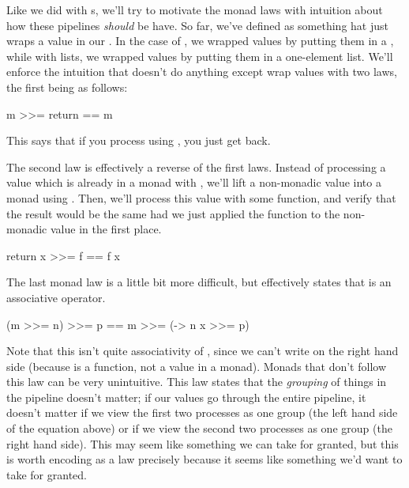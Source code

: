 Like we did with s, we'll try to motivate the monad laws with intuition about how
these pipelines \emph{should} be have. So far, we've defined  as something hat just
wraps a value in our . In the case of , we wrapped values by putting
them in a , while with lists, we wrapped values by putting them in a one-element list.
We'll enforce the intuition that  doesn't do anything except wrap values with two
laws, the first being as follows:
\begin{haskell}
m >>= return == m
\end{haskell}
This says that if you process  using , you just get  back.

The second law is effectively a reverse of the first laws. Instead of processing a value which is
already in a monad with , we'll lift a non-monadic value into a monad using
. Then, we'll process this value with some function, and verify that the result would
be the same had we just applied the function to the non-monadic value in the first place.
\begin{haskell}
return x >>= f == f x
\end{haskell}

The last monad law is a little bit more difficult, but effectively states that \inline{>>=} is an
associative operator.
\begin{haskell}
(m >>= n) >>= p == m >>= (\x -> n x >>= p)
\end{haskell}
Note that this isn't quite associativity of \inline{>>=}, since we can't write 
on the right hand side (because  is a function, not a value in a monad). Monads that don't
follow this law can be very unintuitive. This law states that the \emph{grouping} of things in the
pipeline doesn't matter; if our values go through the entire pipeline, it doesn't matter if we view
the first two processes as one group (the left hand side of the equation above) or if we view the
second two processes as one group (the right hand side). This may seem like something we can take
for granted, but this is worth encoding as a law precisely because it seems like something we'd want
to take for granted.

